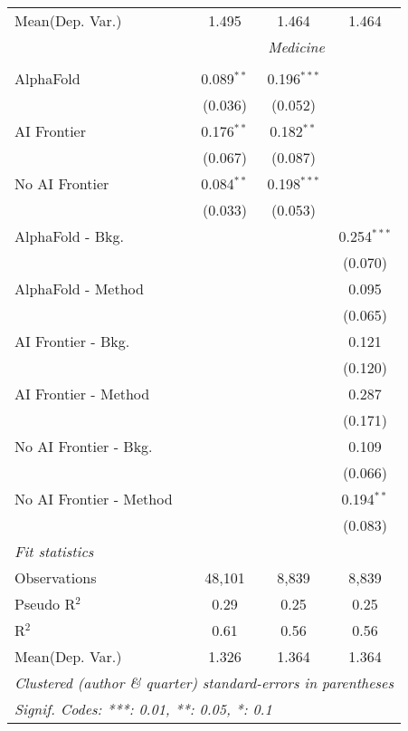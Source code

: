 \begin{tabular}{lccc}
Mean(Dep. Var.) & 1.495 & 1.464 & 1.464 \\
 & \multicolumn{3}{c}{\textit{Medicine}} \\ \\
   AlphaFold               & 0.089$^{**}$ & 0.196$^{***}$ &   \\   
                           & (0.036)      & (0.052)       &   \\   
   AI Frontier             & 0.176$^{**}$ & 0.182$^{**}$  &   \\   
                           & (0.067)      & (0.087)       &   \\   
   No AI Frontier          & 0.084$^{**}$ & 0.198$^{***}$ &   \\   
                           & (0.033)      & (0.053)       &   \\   
   AlphaFold - Bkg.        &              &               & 0.254$^{***}$\\   
                           &              &               & (0.070)\\   
   AlphaFold - Method      &              &               & 0.095\\   
                           &              &               & (0.065)\\   
   AI Frontier - Bkg.      &              &               & 0.121\\   
                           &              &               & (0.120)\\   
   AI Frontier - Method    &              &               & 0.287\\   
                           &              &               & (0.171)\\   
   No AI Frontier - Bkg.   &              &               & 0.109\\   
                           &              &               & (0.066)\\   
   No AI Frontier - Method &              &               & 0.194$^{**}$\\   
                           &              &               & (0.083)\\   
   \midrule
   \emph{Fit statistics}\\
   Observations            & 48,101       & 8,839         & 8,839\\  
   Pseudo R$^2$            & 0.29         & 0.25          & 0.25\\  
   R$^2$                   & 0.61         & 0.56          & 0.56\\  
Mean(Dep. Var.) & 1.326 & 1.364 & 1.364 \\
   \midrule \midrule
   \multicolumn{4}{l}{\emph{Clustered (author \& quarter) standard-errors in parentheses}}\\
   \multicolumn{4}{l}{\emph{Signif. Codes: ***: 0.01, **: 0.05, *: 0.1}}\\
\end{tabular}
\par\endgroup
